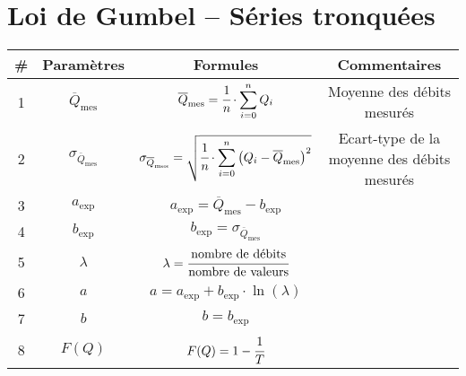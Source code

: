 \section{Loi de Gumbel -- Séries tronquées}
\begin{table}[H]
    \centering
    \begin{tabular}{c|c|c|c}
        \# & \textbf{Paramètres}                & \textbf{Formules}                                                                                                                         & \textbf{Commentaires}      \\
        \hline
        1  & $\overline{Q}_\text{mes}$          & $\overline{Q}_\text{mes} = \cfrac{1}{n} \cdot \displaystyle{\sum_{i=0}^{n} Q_i}$                                                          & Moyenne des débits mesurés \\
        \hline
        2  & $\sigma_{\overline{Q}_\text{mes}}$ & $\sigma_{\overline{Q}_\text{mes}} = \sqrt{\cfrac{1}{n} \cdot \displaystyle{\sum_{i=0}^{n} \left(Q_i - \overline{Q}_\text{mes}\right)^2}}$ & Ecart-type de la moyenne des débits mesurés \\
        \hline
        3  & $a_\text{exp}$                     & $a_\text{exp} = \overline{Q}_\text{mes} - b_\text{exp}$                                                                                   & \\
        \hline
        4  & $b_\text{exp}$                     & $b_\text{exp} = \sigma_{\overline{Q}_\text{mes}}$                                                                                         & \\
        \hline
        5  & $\lambda$                          & $\lambda = \cfrac{\text{nombre de débits}}{\text{nombre de valeurs}}$                                                                     & \\                                               
        \hline
        6  & $a$                                & $a = a_\text{exp} + b_\text{exp} \cdot \ln \left(\lambda\right)$                                                                          & \\                                                                                         
        \hline
        7  & $b$                                & $b = b_\text{exp}$                                                                                                                        & \\
        \hline
        8  & $F(Q)$                             & $F(Q) = 1-\cfrac{1}{T}$                                                                                                                   & \\

\end{tabular}
\end{table}
